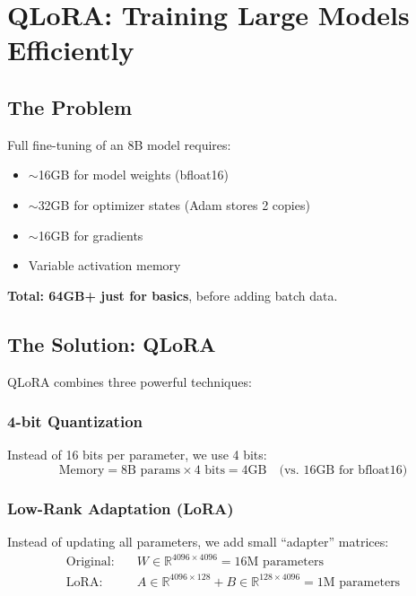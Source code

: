 \documentclass[11pt,a4paper]{article}
\begin{document}
\section{QLoRA: Training Large Models Efficiently}

\subsection{The Problem}

Full fine-tuning of an 8B model requires:
\begin{itemize}
    \item $\sim$16GB for model weights (bfloat16)
    \item $\sim$32GB for optimizer states (Adam stores 2 copies)
    \item $\sim$16GB for gradients
    \item Variable activation memory
\end{itemize}

\textbf{Total: 64GB+ just for basics}, before adding batch data.

\subsection{The Solution: QLoRA}

QLoRA combines three powerful techniques:

\subsubsection{4-bit Quantization}
Instead of 16 bits per parameter, we use 4 bits:
\begin{equation}
\text{Memory} = 8\text{B params} \times 4 \text{ bits} = 4\text{GB} \quad \text{(vs. 16GB for bfloat16)}
\end{equation}

\subsubsection{Low-Rank Adaptation (LoRA)}
Instead of updating all parameters, we add small ``adapter'' matrices:
\begin{equation}
\begin{aligned}
\text{Original}: \quad & W \in \mathbb{R}^{4096 \times 4096} = 16\text{M parameters} \\
\text{LoRA}: \quad & A \in \mathbb{R}^{4096 \times 128} + B \in \mathbb{R}^{128 \times 4096} = 1\text{M parameters}
\end{aligned}
\end{equation}
\end{document}

